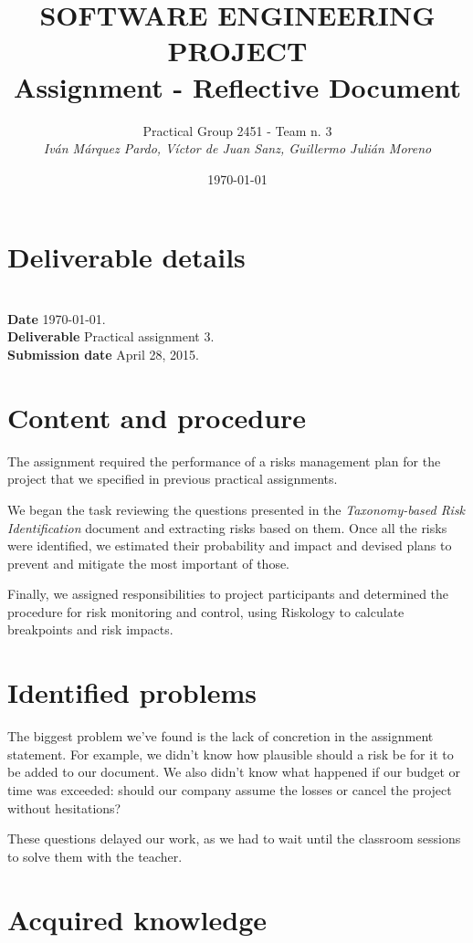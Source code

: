 \documentclass{article}
\title{SOFTWARE ENGINEERING PROJECT\\Assignment  - Reflective Document}
\date{\today}
\author{Practical Group 2451 - Team n. 3 \\ \vspace{5pt} \textit{Iván Márquez Pardo, Víctor de Juan Sanz, Guillermo Julián Moreno}}
\newcommand{\header}[1]{\\ \indent \textbf{#1}\hspace{10pt}}
\begin{document}
\maketitle
\pagestyle{plain}

\section{Deliverable details}

\noindent
\header{Date} \today.
\header{Deliverable} Practical assignment 3.
\header{Submission date} April 28, 2015.

\section{Content and procedure}

The assignment required the performance of a risks management plan for the project that we specified in previous practical assignments.

We began the task reviewing the questions presented in the \textit{Taxonomy-based Risk Identification} document and extracting risks based on them. Once all the risks were identified, we estimated their probability and impact and devised plans to prevent and mitigate the most important of those.


Finally, we assigned responsibilities to project participants and determined the procedure for risk monitoring and control, using Riskology to calculate breakpoints and risk impacts.

\section{Identified problems}

The biggest problem we've found is the lack of concretion in the assignment statement. For example, we didn't know how plausible should a risk be for it to be added to our document. We also didn't know what happened if our budget or time was exceeded: should our company assume the losses or cancel the project without hesitations?

These questions delayed our work, as we had to wait until the classroom sessions to solve them with the teacher.

\section{Acquired knowledge}
\end{document}
